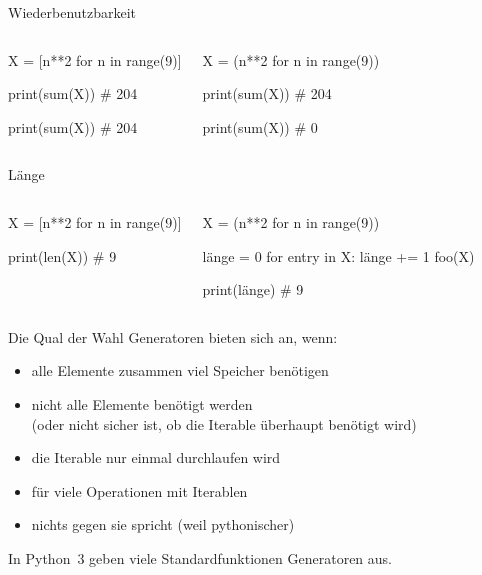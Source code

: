 \documentclass[xcolor=dvipsnames, aspectratio=169, 14pt]{beamer}
\begin{document}

\begin{frame}[fragile]{Wiederbenutzbarkeit}
	\begin{columns}%
	\begin{python3code}
	X = [n**2 for n in range(9)]
	
	print(sum(X))
	# 204
	
	print(sum(X))
	# 204
	\end{python3code}
	
	\begin{python3code}
	X = (n**2 for n in range(9))
	
	print(sum(X))
	# 204
	
	print(sum(X))
	# 0
	\end{python3code}
	\end{columns}
\end{frame}

\begin{frame}[fragile]{Länge}
	\begin{columns}%
	\column[t]{0.5\linewidth}
	\vspace{-\baselineskip}
	\begin{python3code}
	X = [n**2 for n in range(9)]
	
	print(len(X))
	# 9
	\end{python3code}
	
	\column[t]{0.5\linewidth}
	\vspace{-\baselineskip}
	\begin{python3code}
	X = (n**2 for n in range(9))

	länge = 0
	for entry in X:
		länge += 1
		foo(X)

	print(länge)
	# 9
	\end{python3code}
	\end{columns}
\end{frame}

\begin{frame}{Die Qual der Wahl}
	Generatoren bieten sich an, wenn:
	\vfill
	\begin{itemize}
		\setlength{\itemsep}{\fill}
		\item alle Elemente zusammen viel Speicher benötigen
		\item nicht alle Elemente benötigt werden\\ (oder nicht sicher ist, ob die Iterable überhaupt benötigt wird)
		\item die Iterable nur einmal durchlaufen wird
		\item für viele Operationen mit Iterablen
		\item nichts gegen sie spricht (weil pythonischer)
	\end{itemize}
	\vfill
	In Python~3 geben viele Standardfunktionen Generatoren aus.
\end{frame}
\end{document}
